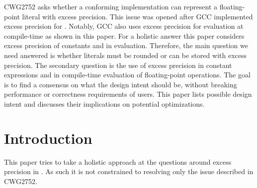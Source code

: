 \newcommand\wgTitle{Floating-Point Excess Precision}
\newcommand\wgName{Matthias Kretz <m.kretz@gsi.de>}
\newcommand\wgDocumentNumber{P3488R1}
\newcommand\wgGroup{SG6, EWG}
\newcommand\wgTarget{\CC{}26}

\usepackage{mymacros}
\usepackage{wg21}
\usepackage{changelog}
\usepackage{underscore}



\renewcommand{\lst}[1]{Listing~\ref{#1}}
\renewcommand{\sect}[1]{Section~\ref{#1}}
\renewcommand{\ttref}[1]{Tony~Table~\ref{#1}}
\newcommand\fp{floating-point\xspace}
\newcommand\Fp{Floating-point\xspace}
\newcommand\discussionref[1]{\hyperref[d:#1]{\color{Headings}$\rightarrow$ Discussion}}


\begin{wgTitlepage}
  CWG2752 asks whether a conforming implementation can represent a \fp literal
  with excess precision.
  This issue was opened after GCC implemented excess precision for \CC{}.
  Notably, GCC also uses excess precision for evaluation at compile-time as
  shown in this paper.
  For a holistic answer this paper considers excess precision of constants and
  in evaluation.
  Therefore, the main question we need answered is whether literals must be
  rounded or can be stored with excess precision.
  The secondary question is the use of excess precision in constant expressions
  and in compile-time evaluation of floating-point operations.
  The goal is to find a consensus on what the design intent should be, without
  breaking performance or correctness requirements of \CC{} users.
  This paper lists possible design intent and discusses their implications on
  potential optimizations.
\end{wgTitlepage}

\pagestyle{scrheadings}




\section{Introduction}

This paper tries to take a holistic approach at the questions around excess
precision in \CC{}.
As such it is not constrained to resolving only the issue described in CWG2752.

